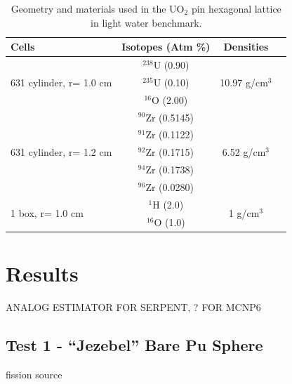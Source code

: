 \documentclass[preprint,12pt]{elsarticle}
\begin{document}
\begin{table}[h]
\centering
\caption{Geometry and materials used in the UO$_2$ pin hexagonal lattice in light water benchmark.}
\label{hex_geom}
\begin{tabular}{| l | c | c | c |}
\hline
Cells & Isotopes (Atm \%)& Densities \\
\hline
\multirow{3}{*}{631 cylinder, r= 1.0 cm }  &   $^{238}$U   (0.90) &    \multirow{3}{*}{10.97 g/cm$^3$} \\
                                           &   $^{235}$U   (0.10)& \\
                                           &   $^{16}$O    (2.00)& \\
\hline
\multirow{5}{*}{631 cylinder, r= 1.2 cm }  &   $^{90}$Zr   (0.5145) &    \multirow{5}{*}{6.52 g/cm$^3$} \\
                                           &   $^{91}$Zr   (0.1122)& \\
                                           &   $^{92}$Zr   (0.1715)& \\
                                           &   $^{94}$Zr   (0.1738)& \\
                                           &   $^{96}$Zr   (0.0280)& \\
\hline
\multirow{2}{*}{1 box, r= 1.0 cm }  &    $^{1}$H  (2.0) &    \multirow{2}{*}{1 g/cm$^3$} \\
                                    &   $^{16}$O  (1.0) & \\
\hline
\end{tabular}
\end{table}





\section{Results}
\label{sec:results}

ANALOG ESTIMATOR FOR SERPENT, ? FOR MCNP6

\subsection{Test 1 - ``Jezebel'' Bare Pu Sphere}

fission source
\end{document}
